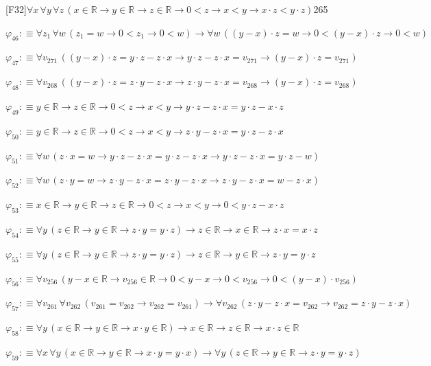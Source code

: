 \begin{fullproof}{[F32]}{$\forall x\,\forall y\,\forall z\,(x \in \mathbb{R} \to y \in \mathbb{R} \to z \in \mathbb{R} \to 0 < z \to x < y \to x \cdot z < y \cdot z)$}{265}
\begin{abbrevlist}
\item $\varphi_{46} :\equiv \forall z_{1}\,\forall w\,(z_{1} = w \to 0 < z_{1} \to 0 < w) \to \forall w\,((y - x) \cdot z = w \to 0 < (y - x) \cdot z \to 0 < w)$
\item $\varphi_{47} :\equiv \forall v_{271}\,((y - x) \cdot z = y \cdot z - z \cdot x \to y \cdot z - z \cdot x = v_{271} \to (y - x) \cdot z = v_{271})$
\item $\varphi_{48} :\equiv \forall v_{268}\,((y - x) \cdot z = z \cdot y - z \cdot x \to z \cdot y - z \cdot x = v_{268} \to (y - x) \cdot z = v_{268})$
\item $\varphi_{49} :\equiv y \in \mathbb{R} \to z \in \mathbb{R} \to 0 < z \to x < y \to y \cdot z - z \cdot x = y \cdot z - x \cdot z$
\item $\varphi_{50} :\equiv y \in \mathbb{R} \to z \in \mathbb{R} \to 0 < z \to x < y \to z \cdot y - z \cdot x = y \cdot z - z \cdot x$
\item $\varphi_{51} :\equiv \forall w\,(z \cdot x = w \to y \cdot z - z \cdot x = y \cdot z - z \cdot x \to y \cdot z - z \cdot x = y \cdot z - w)$
\item $\varphi_{52} :\equiv \forall w\,(z \cdot y = w \to z \cdot y - z \cdot x = z \cdot y - z \cdot x \to z \cdot y - z \cdot x = w - z \cdot x)$
\item $\varphi_{53} :\equiv x \in \mathbb{R} \to y \in \mathbb{R} \to z \in \mathbb{R} \to 0 < z \to x < y \to 0 < y \cdot z - x \cdot z$
\item $\varphi_{54} :\equiv \forall y\,(z \in \mathbb{R} \to y \in \mathbb{R} \to z \cdot y = y \cdot z) \to z \in \mathbb{R} \to x \in \mathbb{R} \to z \cdot x = x \cdot z$
\item $\varphi_{55} :\equiv \forall y\,(z \in \mathbb{R} \to y \in \mathbb{R} \to z \cdot y = y \cdot z) \to z \in \mathbb{R} \to y \in \mathbb{R} \to z \cdot y = y \cdot z$
\item $\varphi_{56} :\equiv \forall v_{256}\,(y - x \in \mathbb{R} \to v_{256} \in \mathbb{R} \to 0 < y - x \to 0 < v_{256} \to 0 < (y - x) \cdot v_{256})$
\item $\varphi_{57} :\equiv \forall v_{261}\,\forall v_{262}\,(v_{261} = v_{262} \to v_{262} = v_{261}) \to \forall v_{262}\,(z \cdot y - z \cdot x = v_{262} \to v_{262} = z \cdot y - z \cdot x)$
\item $\varphi_{58} :\equiv \forall y\,(x \in \mathbb{R} \to y \in \mathbb{R} \to x \cdot y \in \mathbb{R}) \to x \in \mathbb{R} \to z \in \mathbb{R} \to x \cdot z \in \mathbb{R}$
\item $\varphi_{59} :\equiv \forall x\,\forall y\,(x \in \mathbb{R} \to y \in \mathbb{R} \to x \cdot y = y \cdot x) \to \forall y\,(z \in \mathbb{R} \to y \in \mathbb{R} \to z \cdot y = y \cdot z)$

\end{abbrevlist}
\end{fullproof}
